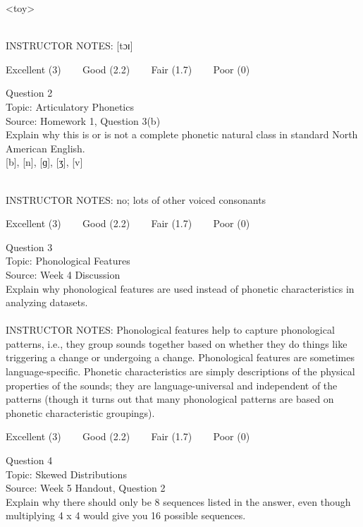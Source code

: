 \documentclass[12pt]{article}
\begin{document}
<toy>


~\\
INSTRUCTOR NOTES: [tɔɪ]


\vfill
Excellent (3) ~~~ Good (2.2) ~~~ Fair (1.7) ~~~ Poor (0)
\newpage

{\large Question 2}\\

Topic: Articulatory Phonetics\\
Source: Homework 1, Question 3(b)\\

Explain why this is or is not a complete phonetic natural class in standard North American English.\\

{[b]}, {[n]}, {[ɡ]}, {[ʒ]}, {[v]}


~\\
INSTRUCTOR NOTES: no; lots of other voiced consonants


\vfill
Excellent (3) ~~~ Good (2.2) ~~~ Fair (1.7) ~~~ Poor (0)
\newpage

{\large Question 3}\\

Topic: Phonological Features\\
Source: Week 4 Discussion\\

Explain why phonological features are used instead of phonetic characteristics in analyzing datasets.\\


~\\
INSTRUCTOR NOTES: Phonological features help to capture phonological patterns, i.e., they group sounds together based on whether they do things like triggering a change or undergoing a change. Phonological features are sometimes language-specific. Phonetic characteristics are simply descriptions of the physical properties of the sounds; they are language-universal and independent of the patterns (though it turns out that many phonological patterns are based on phonetic characteristic groupings).


\vfill
Excellent (3) ~~~ Good (2.2) ~~~ Fair (1.7) ~~~ Poor (0)
\newpage

{\large Question 4}\\

Topic: Skewed Distributions\\
Source: Week 5 Handout, Question 2\\

Explain why there should only be 8 sequences listed in the answer, even though multiplying 4 x 4 would give you 16 possible sequences.\\
\end{document}
